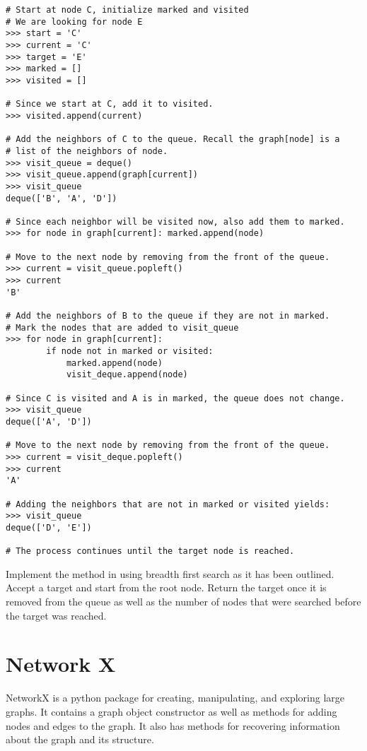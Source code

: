 \begin{lstlisting}
# Start at node C, initialize marked and visited
# We are looking for node E
>>> start = 'C'
>>> current = 'C'
>>> target = 'E'
>>> marked = []
>>> visited = []

# Since we start at C, add it to visited.
>>> visited.append(current)

# Add the neighbors of C to the queue. Recall the graph[node] is a
# list of the neighbors of node.
>>> visit_queue = deque()
>>> visit_queue.append(graph[current])
>>> visit_queue
deque(['B', 'A', 'D'])

# Since each neighbor will be visited now, also add them to marked.
>>> for node in graph[current]: marked.append(node) 

# Move to the next node by removing from the front of the queue.
>>> current = visit_queue.popleft()
>>> current
'B'

# Add the neighbors of B to the queue if they are not in marked.
# Mark the nodes that are added to visit_queue
>>> for node in graph[current]:
		if node not in marked or visited:
			marked.append(node)
			visit_deque.append(node)

# Since C is visited and A is in marked, the queue does not change.
>>> visit_queue
deque(['A', 'D'])

# Move to the next node by removing from the front of the queue.
>>> current = visit_deque.popleft()
>>> current
'A'

# Adding the neighbors that are not in marked or visited yields:
>>> visit_queue
deque(['D', 'E'])

# The process continues until the target node is reached.
\end{lstlisting}

\begin{problem}
Implement the  method in  using breadth first search as it has been outlined.
Accept a target and start from the root node.
Return the target once it is removed from the queue as well as the number of nodes that were searched before the target was reached.
\end{problem}

\section*{Network X}

NetworkX is a python package for creating, manipulating, and exploring large graphs.
It contains a graph object constructor as well as methods for adding nodes and edges to the graph.
It also has methods for recovering information about the graph and its structure.

